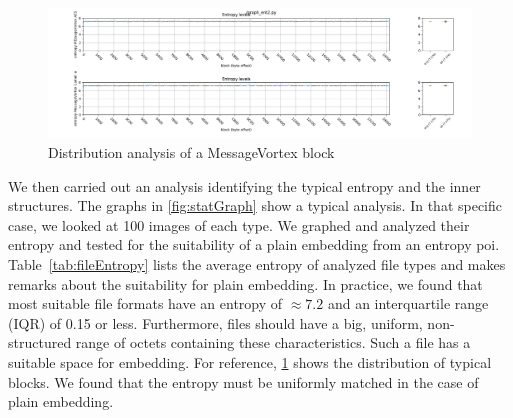 \begin{figure}[ht]
	\includegraphics[width=\textwidth]{inc/statanalysis_mv}
	\caption{Distribution analysis of a MessageVortex block}
	\label{fig:statMvGraph}
\end{figure}

We then carried out an analysis identifying the typical entropy and the inner structures. The graphs in \cref{fig:statGraph} show a typical analysis. In that specific case, we looked at 100 images of each type. We graphed and analyzed their entropy and tested for the suitability of a plain embedding from an entropy poi. Table~\ref{tab:fileEntropy} lists the average entropy of analyzed file types and makes remarks about the suitability for plain embedding. In practice, we found that most suitable file formats have an entropy of $\approx 7.2$ and an interquartile range (IQR) of 0.15 or less. Furthermore, files should have a big, uniform, non-structured range of octets containing these characteristics. Such a file has a suitable space for embedding. For reference, \cref{fig:statMvGraph} shows the distribution of typical \MessageVortex{} blocks. We found that the entropy must be uniformly matched in the case of plain embedding.

